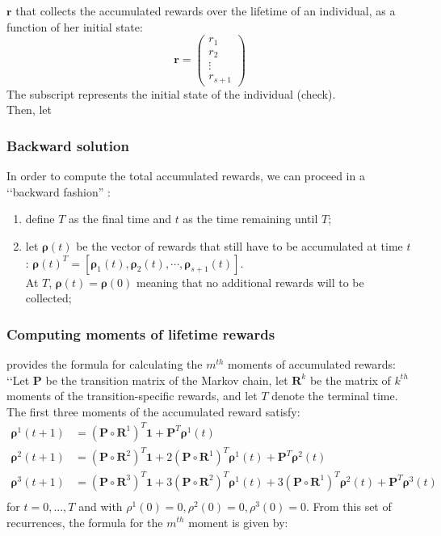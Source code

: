 \documentclass[\main/main.tex]{subfiles}
\begin{document}
$\bm{r}$ that collects the accumulated rewards over the lifetime of an individual, as a function of her initial state:
\begin{equation}
 \bm{r} =
\begin{pmatrix}
r_1\\
r_2\\
\vdots\\
r_{s+1}
\end{pmatrix}
\end{equation}
The subscript represents the initial state of the individual (check).\\
Then, let



\subsubsection{Backward solution}
In order to compute the total accumulated rewards, we can proceed in a \lq\lq backward fashion'' \citep{Caswell2011, Howard1960}: 
\begin{enumerate}
    \item define $T$ as the final time and $t$ as the time remaining until $T$;
    \item let  $\bm{\rho}(t) $ be the vector of rewards that still have to be accumulated at time $t$: $\bm{\rho}(t)^T = [\bm{\rho}_1(t), \bm{\rho}_2(t), \cdots, \bm{\rho}_{s+1}(t)] $.\\ At $T$, $\bm{\rho}(t) = \bm{\rho}(0) $  meaning that no additional rewards will to be collected;
\end{enumerate}   

\subsubsection{Computing moments of lifetime rewards}

\cite{Caswell2011} provides the formula for calculating the $m^{th}$ moments of accumulated rewards: \lq\lq Let $\mathbf{P}$ be the transition matrix of the Markov
chain, let $\mathbf{R}^k$ be the matrix of $k^{th}$ moments of the transition-specific rewards, and let $T$ denote the terminal time. The first three moments of the accumulated reward satisfy: 
\begin{equation}
    \begin{split}
     \bm{\rho}^1(t+1) &= (\mathbf{P} \circ \mathbf{R}^1) ^T\mathbf{1} + \mathbf{P}^T \bm{\rho}^1(t) \\
      \bm{\rho}^2(t+1) &= (\mathbf{P} \circ \mathbf{R}^2) ^ T\mathbf{1} + 2 (\mathbf{P} \circ \mathbf{R}^1) ^T \bm{\rho}^1(t) + 
      \mathbf{P}^T \bm{\rho}^2(t) \\
     \bm{\rho}^3(t+1) &= (\mathbf{P} \circ \mathbf{R}^3) ^ T\mathbf{1} + 3 (\mathbf{P} \circ \mathbf{R}^2) ^T \bm{\rho}^1(t) + 3 (\mathbf{P} \circ \mathbf{R}^1) ^T \bm{\rho}^2(t) + \mathbf{P}^T \bm{\rho}^3(t) \\
\end{split}
\end{equation}for $t=0, ... ,T$ and with $\rho^1(0) = 0, \rho^2(0) = 0,\rho^3(0) = 0$.
From this set of recurrences, the formula for the $m^{th}$ moment is given by:
\end{document}

